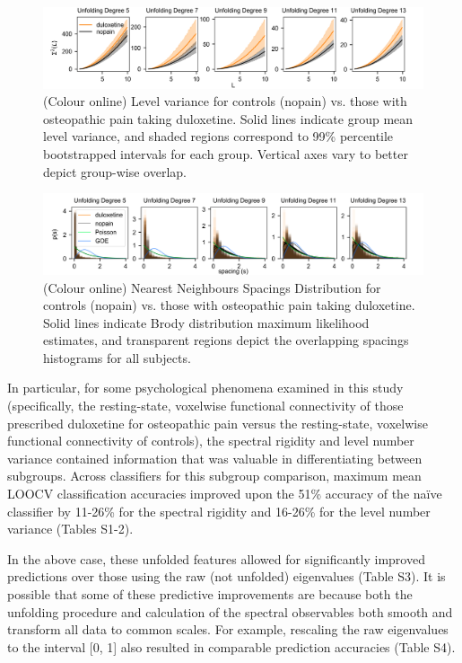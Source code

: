 \documentclass[10pt]{article}
\begin{document}
\begin{figure}[ht]
\centerline{\includegraphics[width=\textwidth]{figure2}} \caption{
    (Colour online) Level variance for controls (nopain) vs. those with osteopathic pain taking
    duloxetine. Solid lines indicate group mean level variance, and shaded regions correspond to
    99\% percentile bootstrapped intervals for each group.  Vertical axes vary to better depict
    group-wise overlap.
}
\label{fig:levelvar}
\end{figure}

\begin{figure}[ht]
\centerline{\includegraphics[width=\textwidth]{figure3}} \caption{
    (Colour online) Nearest Neighbours Spacings Distribution for controls (nopain) vs. those with
    osteopathic pain taking duloxetine. Solid lines indicate Brody distribution maximum likelihood
    estimates, and transparent regions depict the overlapping spacings histograms for all subjects.
}
\label{fig:nnsd}
\end{figure}


In particular, for some psychological phenomena examined in this study (specifically, the
resting-state, voxelwise functional connectivity of those prescribed duloxetine for osteopathic pain
versus the resting-state, voxelwise functional connectivity of controls), the spectral rigidity and
level number variance contained information that was valuable in differentiating between subgroups.
Across classifiers for this subgroup comparison, maximum mean LOOCV classification accuracies
improved upon the 51\% accuracy of the naïve classifier by 11-26\% for the spectral rigidity and
16-26\% for the level number variance (Tables S1-2).

In the above case, these unfolded features allowed for significantly improved predictions over those
using the raw (not unfolded) eigenvalues (Table S3). It is possible that some of these predictive
improvements are because both the unfolding procedure and calculation of the spectral observables
both smooth and transform all data to common scales. For example,  rescaling the raw eigenvalues to
the interval [0, 1] also resulted in comparable prediction accuracies (Table S4).
\end{document}
